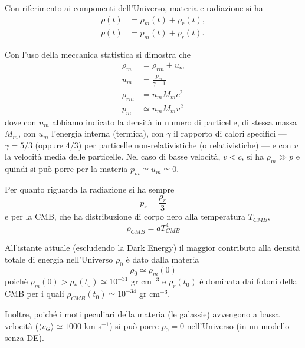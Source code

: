 Con riferimento ai componenti dell'Universo, materia e radiazione si ha
\begin{subequations}
  \begin{align}
  \rho(t) &= \rho_m(t) + \rho_r(t), \\
  p(t) &=p_m(t)+p_r(t).
  \end{align}
\end{subequations}

Con l'uso della meccanica statistica si dimostra che
\begin{subequations}
  \begin{align}
    \rho_m &= \rho_{rm}+ u_m \\
    u_m &= \frac{p_m}{\gamma -1} \\
    \rho_{rm} &= n_m M_m c^2 \\
    p_m &\simeq n_m M_m v^2
  \end{align}
\end{subequations}
dove con $n_m$ abbiamo indicato la densità in numero di particelle, di stessa
massa $M_m$, con $u_m$ l'energia interna (termica), con $\gamma$ il rapporto di
calori specifici --- $\gamma=5/3$ (oppure $4/3$) per particelle
non-relativistiche (o relativistiche) --- e con $v$ la velocità media delle
particelle.  Nel caso di basse velocità, $v<c$, si ha $\rho_m \gg p$ e quindi si
può porre per la materia $p_m \simeq u_m \simeq 0$.

Per quanto riguarda la radiazione si ha sempre
\begin{equation}
  p_r = \frac{\rho_r}{3}
\end{equation}
e per la CMB, che ha distribuzione di corpo nero alla temperatura $T_{CMB}$,
\begin{equation}
  \rho_{CMB} = a T^4_{CMB}
\end{equation}

All'istante attuale (escludendo la Dark Energy) il maggior contributo alla
densità totale di energia nell'Universo $\rho_0$ è dato dalla materia
\begin{equation}
  \rho_0 \simeq \rho_m(0)
\end{equation}
poichè $\rho_m(0) > \rho_*(t_0) \simeq 10^{-31}$ gr cm$^{-3}$ e $\rho_r(t_0)$ è
dominata dai fotoni della CMB per i quali $\rho_{CMB}(t_0) \simeq 10^{-34}$ gr
cm$^{-3}$.

Inoltre, poiché i moti peculiari della materia (le galassie) avvengono a bassa
velocità ($\langle v_{G}\rangle \simeq 1000$ km s$^{-1}$) si può porre $p_0=0$
nell'Universo (in un modello senza DE).

